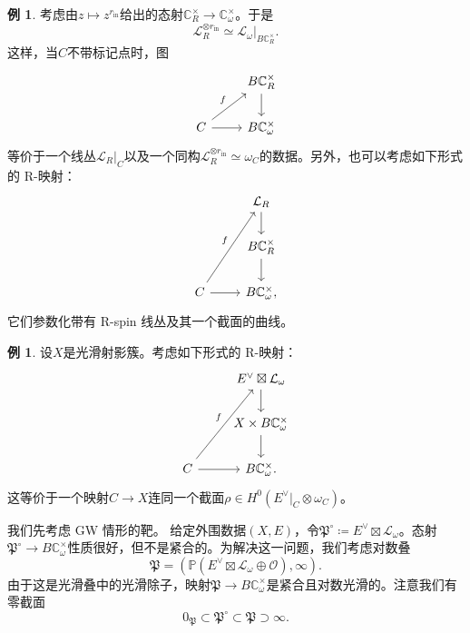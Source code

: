 \documentclass{amsart}
\theoremstyle{definition}
\newtheorem{exm}[thm]{例}
\theoremstyle{remark}
\theoremstyle{plain}
\theoremstyle{definition}
\theoremstyle{remark}
\newcommand{\C}{\mathbb{C}}
\renewcommand{\P}{\mathbb{P}}
\newcommand{\mc}[1]{\mathcal{#1}}
\newcommand{\mf}[1]{\mathfrak{#1}}
\newcommand{\mr}[1]{\mathrm{#1}}
\newcommand{\1}{\mathbf{1}}
\newcommand{\2}{\mathbf{2}}
\newcommand{\3}{\mathbf{3}}
\begin{document}
\begin{exm}
    考虑由\(z \mapsto z^{r_{\mr{in}}}\)给出的态射\(\C^{\times}_R \to \C^{\times}_{\omega}\)。于是
    \[ \mc{L}_R^{\otimes r_{\mr{in}}} \simeq \mc{L}_{\omega} |_{B \C_R^{\times}}. \]
    这样，当\(C\)不带标记点时，图
    \begin{equation*}
    \begin{tikzcd}
        & B \C_R^{\times} \ar{d} \\
        C \ar{ur}{f} \ar{r} & B \C_{\omega}^{\times}
    \end{tikzcd}
    \end{equation*}
    等价于一个线丛\(\mc{L}_R|_C\)以及一个同构\(\mc{L}_R^{\otimes r_{\mr{in}}} \simeq \omega_C\)的数据。另外，也可以考虑如下形式的 R-映射：
    \begin{equation*}
    \begin{tikzcd}
        & \mc{L}_R \ar{d} \\
        & B \C_R^{\times} \ar{d} \\
        C \ar{uur}{f} \ar{r} & B \C_{\omega}^{\times},
    \end{tikzcd}
    \end{equation*}
    它们参数化带有 R-spin 线丛及其一个截面的曲线。
\end{exm}

\begin{exm}
    设\(X\)是光滑射影簇。考虑如下形式的 R-映射：
    \begin{equation*}
    \begin{tikzcd}
        & E^{\vee} \boxtimes \mc{L}_{\omega} \ar{d} \\
        & X \times B \C_{\omega}^{\times} \ar{d} \\
        C \ar{uur}{f} \ar{r} & B \C_{\omega}^{\times}.
    \end{tikzcd}
    \end{equation*}
    这等价于一个映射\(C \to X\)连同一个截面\(\rho \in H^0(E^{\vee}|_C \otimes \omega_C)\)。
\end{exm}

我们先考虑 GW 情形的靶。
给定外围数据\((X, E)\)，令\(\mf{P}^{\circ} \coloneqq E^{\vee} \boxtimes \mc{L}_{\omega}\)。态射\(\mf{P}^{\circ} \to B \C_{\omega}^{\times}\)性质很好，但不是紧合的。为解决这一问题，我们考虑对数叠
\[ \mf{P} = ( \P(E^{\vee} \boxtimes \mc{L}_{\omega} \oplus \mc{O}) , \infty). \]
由于这是光滑叠中的光滑除子，映射\(\mf{P} \to B \C_{\omega}^{\times}\)是紧合且对数光滑的。注意我们有零截面
\[ 0_{\mf{P}} \subset \mf{P}^{\circ} \subset \mf{P} \supset \infty. \]
\end{document}
